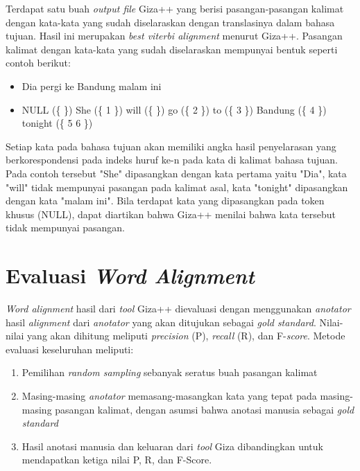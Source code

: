 Terdapat satu buah \textit{output file} Giza++ yang berisi pasangan-pasangan kalimat dengan kata-kata yang sudah diselaraskan dengan translasinya dalam bahasa tujuan. Hasil ini merupakan \textit{best viterbi alignment} menurut Giza++. Pasangan kalimat dengan kata-kata yang sudah diselaraskan mempunyai bentuk seperti contoh berikut:

\begin{itemize}
	\item Dia pergi ke Bandung malam ini
	\item NULL (\{ \}) She (\{ 1 \}) will (\{ \}) go (\{ 2 \}) to (\{ 3 \}) Bandung (\{ 4 \}) tonight (\{ 5 6 \})
\end{itemize}

Setiap kata pada bahasa tujuan akan memiliki angka hasil penyelarasan yang berkorespondensi pada indeks huruf ke-n pada kata di kalimat bahasa tujuan. Pada contoh tersebut "She" dipasangkan dengan kata pertama yaitu "Dia", kata "will" tidak mempunyai pasangan pada kalimat asal, kata "tonight" dipasangkan dengan kata "malam ini". Bila terdapat kata yang dipasangkan pada token khusus (NULL), dapat diartikan bahwa Giza++ menilai bahwa kata tersebut tidak mempunyai pasangan.

\section{Evaluasi \textit{Word Alignment}} \label{sec:pembentukanTdanH}
\textit{Word alignment} hasil dari \textit{tool} Giza++ dievaluasi dengan menggunakan \textit{anotator} hasil \textit{alignment} dari \textit{anotator} yang akan ditujukan sebagai \textit{gold standard}. Nilai-nilai yang akan dihitung meliputi \textit{precision} (P), \textit{recall} (R), dan F-\textit{score}. Metode evaluasi keseluruhan meliputi:

\begin{enumerate}
	\item Pemilihan \textit{random sampling} sebanyak seratus buah pasangan kalimat
	\item Masing-masing \textit{anotator} memasang-masangkan kata yang tepat pada masing-masing pasangan kalimat, dengan asumsi bahwa anotasi manusia sebagai \textit{gold standard}
	\item Hasil anotasi manusia dan keluaran dari \textit{tool} Giza dibandingkan untuk mendapatkan ketiga nilai P, R, dan F-Score.
\end{enumerate}


